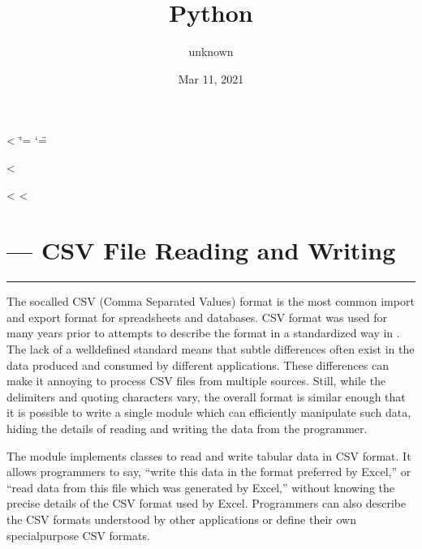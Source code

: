 \documentclass[letterpaper,10pt,english]{sphinxmanual}
\title{Python}
\date{Mar 11, 2021}
\author{unknown}
\begin{document}
<%
  \ifnum\catcode`\=\string=\active\shorthandoff{=}\fi
  \ifnum\catcode`\"=\active{}\fi
\fi

<%
\sphinxmaketitle
\pagestyle{plain}
\sphinxtableofcontents
\pagestyle{normal}
\label{\detokenize{index::doc}}


<%
<%

\chapter{ — CSV File Reading and Writing}
\label{\detokenize{csv:module-csv}}\label{\detokenize{csv:csv-csv-file-reading-and-writing}}\label{\detokenize{csv::doc}}
\ignorespaces

\bigskip\hrule\bigskip


The so\sphinxhyphen{}called CSV (Comma Separated Values) format is the most common import and
export format for spreadsheets and databases.  CSV format was used for many
years prior to attempts to describe the format in a standardized way in
.  The lack of a well\sphinxhyphen{}defined standard means that subtle differences
often exist in the data produced and consumed by different applications.  These
differences can make it annoying to process CSV files from multiple sources.
Still, while the delimiters and quoting characters vary, the overall format is
similar enough that it is possible to write a single module which can
efficiently manipulate such data, hiding the details of reading and writing the
data from the programmer.

The {\hyperref[\detokenize{csv:module-csv}]{}} module implements classes to read and write tabular data in CSV
format.  It allows programmers to say, “write this data in the format preferred
by Excel,” or “read data from this file which was generated by Excel,” without
knowing the precise details of the CSV format used by Excel.  Programmers can
also describe the CSV formats understood by other applications or define their
own special\sphinxhyphen{}purpose CSV formats.
\end{document}
